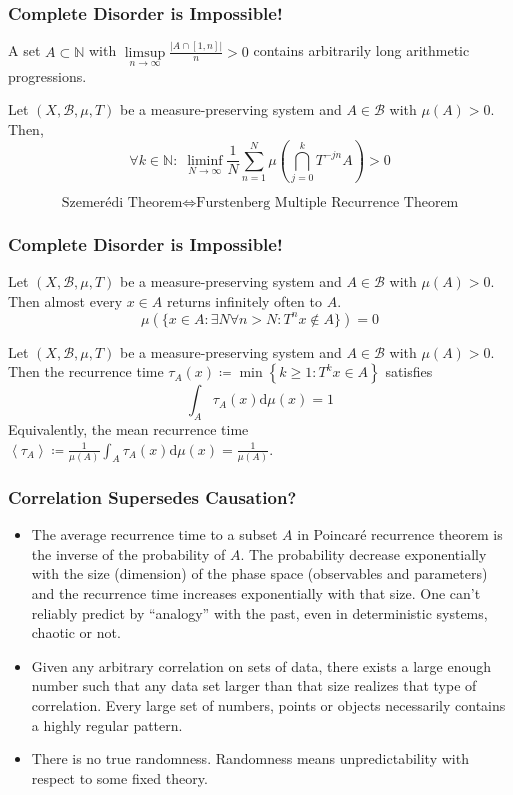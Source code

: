 \documentclass[UTF8,11pt,colorlinks,compress,openany]{beamer}%
\begin{document}
\begin{frame}\frametitle{Complete Disorder is Impossible!}
\setlength\abovedisplayskip{0pt}
	\begin{theorem}
		A set $A\subset\mathbb{N}$ with $\limsup\limits_{n\to\infty}{\frac {|A\cap [1,n]|}{n}}>0$ contains arbitrarily long arithmetic progressions.
	\end{theorem}
	\begin{theorem}
		Let $(X,{\mathcal{B}},\mu,T)$ be a measure-preserving system and $A\in\mathcal{B}$ with $\mu(A) > 0$. Then,
		\[\forall k\in\mathbb{N}:\;\liminf\limits_{N\to\infty}\dfrac{1}{N}\sum\limits_{n=1}^N\mu\left(\bigcap\limits_{j=0}^k T^{-jn}A\right)>0\]
	\end{theorem}
	\[\text{Szemer\'edi Theorem}\iff\text{Furstenberg Multiple Recurrence Theorem}\]
\end{frame}

\begin{frame}\frametitle{Complete Disorder is Impossible!}
	\begin{theorem}
		Let $(X,{\mathcal{B}},\mu,T)$ be a measure-preserving system and $A\in\mathcal{B}$ with $\mu(A) > 0$. Then almost every $x\in A$ returns infinitely often to $A$.
		\[
		\mu\left(\{x\in A: \exists N\forall n>N: T^n x\notin A\}\right)=0
		\]
	\end{theorem}
	\begin{lemma}
		Let $(X,{\mathcal{B}},\mu,T)$ be a measure-preserving system and $A\in\mathcal{B}$ with $\mu(A) > 0$. Then the recurrence time $\tau_A(x)\coloneqq \min\left\{k\geq 1: T^k x\in A\right\}$ satisfies
		\[\int_A\!\tau_A(x)\mathrm{d}\mu(x)=1\]
		Equivalently, the mean recurrence time $\left\langle \tau_A\right\rangle\coloneqq \frac{1}{\mu(A)}\int_A\!\tau_A(x)\mathrm{d}\mu(x)=\frac{1}{\mu(A)}$.
	\end{lemma}
\end{frame}

\begin{frame}\frametitle{Correlation Supersedes Causation?}
	\begin{itemize}
		\item The average recurrence time to a subset $A$ in Poincar\'e recurrence theorem is the inverse of the probability of $A$. The probability decrease exponentially with the size (dimension) of the phase space (observables and parameters) and the recurrence time increases exponentially with that size. One can't reliably predict by ``analogy'' with the past, even in deterministic systems, chaotic or not.
		\item Given any arbitrary correlation on sets of data, there exists a large enough number such that any data set larger than that size realizes that type of correlation. Every large set of numbers, points or objects necessarily contains a highly regular pattern.
		\item There is no true randomness. Randomness means unpredictability with respect to some fixed theory.
	\end{itemize}
\end{frame}
\end{document}
